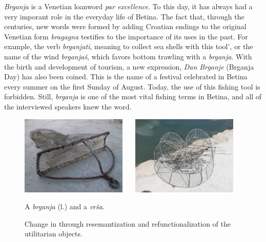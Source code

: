 \documentclass[output=paper]{LSP/langsci}
\begin{document}
\textit{Brganja} is a Venetian loanword \textit{par excellence}. To this day, it has always had a very imporant role in the everyday life of Betina. The fact that, through the centuries, new words were formed by adding Croatian endings to the original Venetian form \textit{bragagna} testifies to the importance of its uses in the past. For example, the verb \textit{brganjati}, meaning to collect sea shells with this tool', or the name of the wind \textit{brganjaš}, which favors bottom trawling with a \textit{brganja}. With the birth and development of tourism, a new expression, \textit{Dan Brganje} (Brganja Day) has also been coined. This is the name of a festival celebrated in Betina every summer on the first Sunday of August. Today, the use of this fishing tool is forbidden. Still, \textit{brganja} is one of the most vital fishing terms in Betina, and all of the interviewed speakers knew the word. 


\begin{figure}
\includegraphics[width=0.45\textwidth]{illustrations/skevin_fig4_brganja}~~~
\includegraphics[width=0.45\textwidth]{illustrations/skevin_fig4_vrsa}
\label{fig4_brganja_vrsa}
\caption{A \textit{brganja} (l.) and a \textit{vrša}.}
\end{figure}

\begin{figure}


\caption{Change in  through resemantization and refunctionalization of the utilitarian objects.}
\label{fig:4}
\end{figure}
\end{document}
